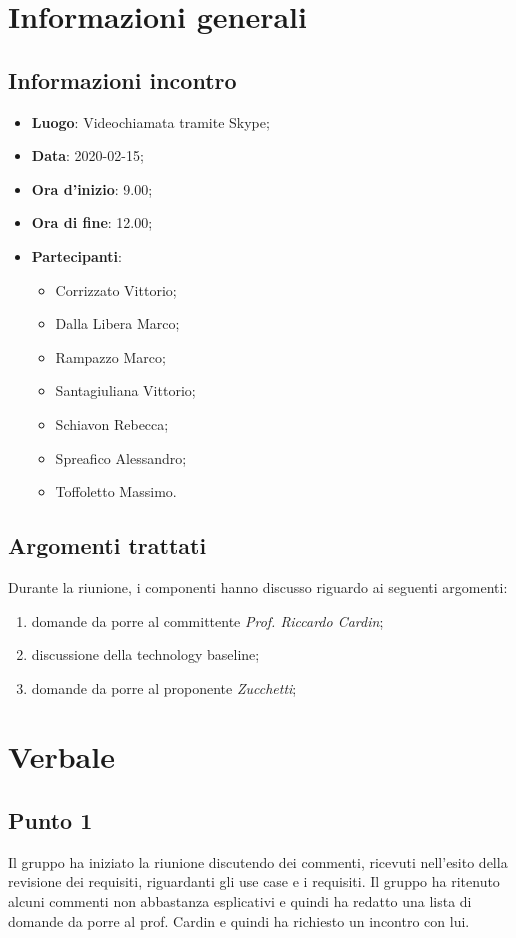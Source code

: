 \section{Informazioni generali}
    \subsection{Informazioni incontro}
        \begin{itemize}
            \item \textbf{Luogo}: Videochiamata tramite Skype;
            \item \textbf{Data}: 2020-02-15;
            \item \textbf{Ora d'inizio}: 9.00;
            \item \textbf{Ora di fine}: 12.00;
            \item \textbf{Partecipanti}: \begin{itemize}
                \item Corrizzato Vittorio;
                \item Dalla Libera Marco;
                \item Rampazzo Marco;
                \item Santagiuliana Vittorio;
                \item Schiavon Rebecca;
                \item Spreafico Alessandro;
                \item Toffoletto Massimo.
            \end{itemize}
        \end{itemize}
    \subsection{Argomenti trattati}
		Durante la riunione, i componenti hanno discusso riguardo ai seguenti argomenti:
        \begin{enumerate}
        	\item domande da porre al committente \textit{Prof. Riccardo Cardin};
        	\item discussione della technology baseline;
            \item domande da porre al proponente \textit{Zucchetti};
        \end{enumerate}
\section{Verbale}
    \subsection{Punto 1}
    	Il gruppo ha iniziato la riunione discutendo dei commenti, ricevuti nell'esito della revisione dei requisiti, riguardanti gli use case e i requisiti. Il gruppo ha ritenuto alcuni commenti non abbastanza esplicativi e quindi ha redatto una lista di domande da porre al prof. Cardin e quindi ha richiesto un incontro con lui.
            
